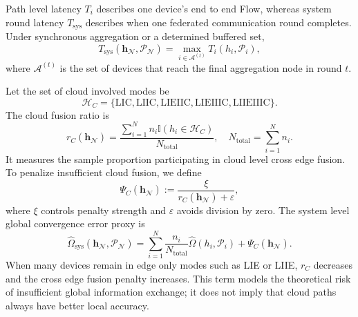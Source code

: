 ﻿\documentclass[preprint,12pt]{elsarticle}
\theoremstyle{plain}
\theoremstyle{definition}
\theoremstyle{remark}
\begin{document}
Path level latency \(T_i\) describes one device's end to end Flow, whereas system round latency \(T_{\mathrm{sys}}\) describes when one federated communication round completes.
Under synchronous aggregation or a determined buffered set,
\begin{equation}
T_{\mathrm{sys}}(\mathbf{h}_{\mathcal{N}},\boldsymbol{\mathcal{P}}_{\mathcal{N}})
= \max_{i\in\mathcal{A}^{(t)}} T_i(h_i,\mathcal{P}_i),
\label{eq:global_latency}
\end{equation}
where \(\mathcal{A}^{(t)}\) is the set of devices that reach the final aggregation node in round \(t\).

Let the set of cloud involved modes be
\begin{equation}
\mathcal{H}_C=\{\mathrm{LIC},\mathrm{LIIC},\mathrm{LIEIIC},\mathrm{LIEIIIC},\mathrm{LIIEIIIC}\}.
\end{equation}
The cloud fusion ratio is
\begin{equation}
r_C(\mathbf{h}_{\mathcal{N}})
=
\frac{\sum_{i=1}^{N} n_i\mathbb{I}(h_i\in\mathcal{H}_{C})}{N_{\mathrm{total}}},
\quad
N_{\mathrm{total}}=\sum_{i=1}^{N}n_i.
\end{equation}
It measures the sample proportion participating in cloud level cross edge fusion.
To penalize insufficient cloud fusion, we define
\begin{equation}
\Psi_C(\mathbf{h}_{\mathcal{N}})
:=
\frac{\xi}{r_C(\mathbf{h}_{\mathcal{N}})+\varepsilon},
\label{eq:cloud_penalty}
\end{equation}
where \(\xi\) controls penalty strength and \(\varepsilon\) avoids division by zero.
The system level global convergence error proxy is
\begin{equation}
\widehat{\Omega}_{\mathrm{sys}}(\mathbf{h}_{\mathcal{N}},\boldsymbol{\mathcal{P}}_{\mathcal{N}})
=
\sum_{i=1}^{N}
\frac{n_i}{N_{\mathrm{total}}}
\widehat{\Omega}(h_i,\mathcal{P}_i)
+\Psi_C(\mathbf{h}_{\mathcal{N}}).
\label{eq:global_omega}
\end{equation}
When many devices remain in edge only modes such as LIE or LIIE, \(r_C\) decreases and the cross edge fusion penalty increases.
This term models the theoretical risk of insufficient global information exchange; it does not imply that cloud paths always have better local accuracy.
\end{document}
